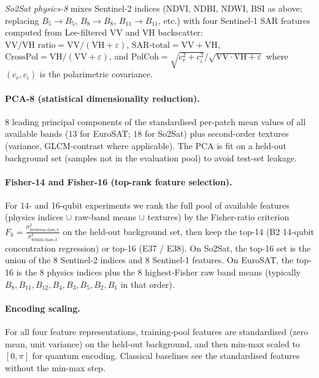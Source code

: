 \documentclass[pdflatex,sn-mathphys-num]{sn-jnl}
\theoremstyle{thmstyleone}
\theoremstyle{thmstyletwo}
\theoremstyle{thmstylethree}
\begin{document}
\noindent \emph{So2Sat physics-8} mixes Sentinel-2 indices (NDVI, NDBI,
NDWI, BSI as above; replacing $B_5\!\to\!B_5$, $B_8\!\to\!B_8$,
$B_{11}\!\to\!B_{11}$, etc.) with four Sentinel-1 SAR features computed
from Lee-filtered VV and VH backscatter:
$\text{VV/VH ratio}=\mathrm{VV}/(\mathrm{VH}+\varepsilon)$,
$\text{SAR-total}=\mathrm{VV}+\mathrm{VH}$,
$\text{CrossPol}=\mathrm{VH}/(\mathrm{VV}+\varepsilon)$, and
$\text{PolCoh} = \sqrt{c_r^2+c_i^2}/\sqrt{\mathrm{VV}\cdot\mathrm{VH}+\varepsilon}$
where $(c_r, c_i)$ is the polarimetric covariance.

\paragraph{PCA-8 (statistical dimensionality reduction).}
8 leading principal components of the standardised per-patch mean
values of all available bands ($13$ for EuroSAT; $18$ for So2Sat) plus
second-order textures (variance, GLCM-contrast where applicable).
The PCA is fit on a held-out background set (samples not in the
evaluation pool) to avoid test-set leakage.

\paragraph{Fisher-14 and Fisher-16 (top-rank feature selection).}
For 14- and 16-qubit experiments we rank the full pool of available
features (physics indices $\cup$ raw-band means $\cup$ textures) by
the Fisher-ratio criterion
$F_k = \tfrac{\sigma^2_{\text{between-class},k}}{\sigma^2_{\text{within-class},k}}$
on the held-out background set, then keep the top-14 (B2 14-qubit
concentration regression) or top-16 (E37 / E38). On So2Sat, the
top-16 set is the union of the 8 Sentinel-2 indices and 8 Sentinel-1
features. On EuroSAT, the top-16 is the 8 physics indices plus the 8
highest-Fisher raw band means (typically $B_8, B_{11}, B_{12}, B_4,
B_3, B_5, B_2, B_{1}$ in that order).

\paragraph{Encoding scaling.}
For all four feature representations, training-pool features are
standardised (zero mean, unit variance) on the held-out background, and
then min-max scaled to $[0, \pi]$ for quantum encoding. Classical
baselines see the standardised features without the min-max step.
\end{document}
